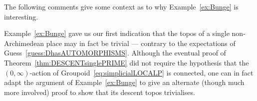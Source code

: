 \documentclass[a4paper, 11pt,reqno]{amsart}
\newcommand{\Set}{\mathrm{Set}}
\newcommand{\baseS}{\mathcal{S}}
\newcommand{\D}{\mathcal{D}}
\begin{document}
The following comments give some context as to why Example~\ref{ex:Bunge} is interesting. 

\begin{discussion} Example~\ref{ex:Bunge} gave us our first indication that the topos of a single non-Archimedean place may in fact be trivial --- contrary to the expectations of Guess~\ref{guess:DhasAUTOMORPHISMS}. Although the eventual proof of Theorem~\ref{thm:DESCENTsinglePRIME} did not require the hypothesis that the $(0,\infty)$-action of Groupoid~\eqref{eq:simplicialLOCALP} is connected, one can in fact adapt the argument of Example~\ref{ex:Bunge} to give an alternate (though much more involved) proof to show that its descent topos trivialises.
	
	
\end{discussion}
\end{document}
